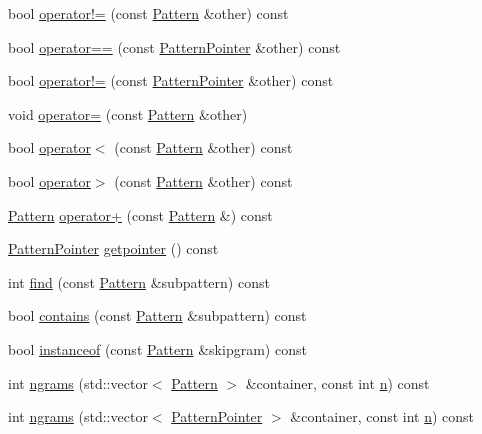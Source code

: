 \begin{DoxyCompactItemize}
\item 
bool \hyperlink{classPattern_ac02b6479822d7c9ad1beb12dc26eb419}{operator!=} (const \hyperlink{classPattern}{Pattern} \&other) const 
\item 
bool \hyperlink{classPattern_a76f58521a5cfa740d502878bf6924071}{operator==} (const \hyperlink{classPatternPointer}{Pattern\+Pointer} \&other) const 
\item 
bool \hyperlink{classPattern_a272c1d3b0a301b0f11dd5d7a80352ca8}{operator!=} (const \hyperlink{classPatternPointer}{Pattern\+Pointer} \&other) const 
\item 
void \hyperlink{classPattern_ae0ea02ade72a1fe7f92cd48d98754559}{operator=} (const \hyperlink{classPattern}{Pattern} \&other)
\item 
bool \hyperlink{classPattern_aaad79201ca656e519b069cd746722d1b}{operator$<$} (const \hyperlink{classPattern}{Pattern} \&other) const 
\item 
bool \hyperlink{classPattern_a638524274293c8001ec8c605ea5697a5}{operator$>$} (const \hyperlink{classPattern}{Pattern} \&other) const 
\item 
\hyperlink{classPattern}{Pattern} \hyperlink{classPattern_a023243f162cf922306129c14ea7786f7}{operator+} (const \hyperlink{classPattern}{Pattern} \&) const 
\item 
\hyperlink{classPatternPointer}{Pattern\+Pointer} \hyperlink{classPattern_a5f7cc0507ceb4f2e72ac535a32938135}{getpointer} () const 
\item 
int \hyperlink{classPattern_abcd8d461a6c7ebdafe764f959f152c83}{find} (const \hyperlink{classPattern}{Pattern} \&subpattern) const 
\item 
bool \hyperlink{classPattern_aa0de9e5bf5611e8072b0324869e2f782}{contains} (const \hyperlink{classPattern}{Pattern} \&subpattern) const 
\item 
bool \hyperlink{classPattern_a62563035a235a84b77fc4bd97bc82e0e}{instanceof} (const \hyperlink{classPattern}{Pattern} \&skipgram) const 
\item 
int \hyperlink{classPattern_a776b95441fb7c4cdd159c7df7b9097af}{ngrams} (std\+::vector$<$ \hyperlink{classPattern}{Pattern} $>$ \&container, const int \hyperlink{classPattern_a13e66bbb8dd77219255ade5aa5f72c7c}{n}) const 
\item 
int \hyperlink{classPattern_ad2a401cd64493ce88725a14333a3d4e4}{ngrams} (std\+::vector$<$ \hyperlink{classPatternPointer}{Pattern\+Pointer} $>$ \&container, const int \hyperlink{classPattern_a13e66bbb8dd77219255ade5aa5f72c7c}{n}) const 
\item 

\end{DoxyCompactItemize}
